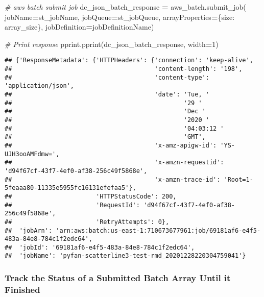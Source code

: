 \documentclass[
]{book}
\newenvironment{Shaded}{\begin{snugshade}}{\end{snugshade}}
\newcommand{\CommentTok}[1]{\textcolor[rgb]{0.56,0.35,0.01}{\textit{#1}}}
\newcommand{\DecValTok}[1]{\textcolor[rgb]{0.00,0.00,0.81}{#1}}
\newcommand{\NormalTok}[1]{#1}
\newcommand{\OperatorTok}[1]{\textcolor[rgb]{0.81,0.36,0.00}{\textbf{#1}}}
\newcommand{\StringTok}[1]{\textcolor[rgb]{0.31,0.60,0.02}{#1}}
\begin{document}
\begin{Shaded}
\begin{Highlighting}[]
\CommentTok{\# aws batch submit job}
\NormalTok{dc\_json\_batch\_response }\OperatorTok{=}\NormalTok{ aws\_batch.submit\_job(}
\NormalTok{    jobName}\OperatorTok{=}\NormalTok{st\_jobName,}
\NormalTok{    jobQueue}\OperatorTok{=}\NormalTok{st\_jobQueue,}
\NormalTok{    arrayProperties}\OperatorTok{=}\NormalTok{\{}\StringTok{\textquotesingle{}size\textquotesingle{}}\NormalTok{: array\_size\},}
\NormalTok{    jobDefinition}\OperatorTok{=}\NormalTok{jobDefinitionName)}

\CommentTok{\# Print response}
\NormalTok{pprint.pprint(dc\_json\_batch\_response, width}\OperatorTok{=}\DecValTok{1}\NormalTok{)}
\end{Highlighting}
\end{Shaded}

\begin{verbatim}
## {'ResponseMetadata': {'HTTPHeaders': {'connection': 'keep-alive',
##                                       'content-length': '198',
##                                       'content-type': 'application/json',
##                                       'date': 'Tue, '
##                                               '29 '
##                                               'Dec '
##                                               '2020 '
##                                               '04:03:12 '
##                                               'GMT',
##                                       'x-amz-apigw-id': 'YS-UJH3ooAMFdmw=',
##                                       'x-amzn-requestid': 'd94f67cf-43f7-4ef0-af38-256c49f5868e',
##                                       'x-amzn-trace-id': 'Root=1-5feaaa80-11335e5955fc16131efefaa5'},
##                       'HTTPStatusCode': 200,
##                       'RequestId': 'd94f67cf-43f7-4ef0-af38-256c49f5868e',
##                       'RetryAttempts': 0},
##  'jobArn': 'arn:aws:batch:us-east-1:710673677961:job/69181af6-e4f5-483a-84e8-784c1f2edc64',
##  'jobId': '69181af6-e4f5-483a-84e8-784c1f2edc64',
##  'jobName': 'pyfan-scatterline3-test-rmd_20201228220304759041'}
\end{verbatim}

\hypertarget{track-the-status-of-a-submitted-batch-array-until-it-finished}{%
\subsubsection{Track the Status of a Submitted Batch Array Until it Finished}\label{track-the-status-of-a-submitted-batch-array-until-it-finished}}
\end{document}
